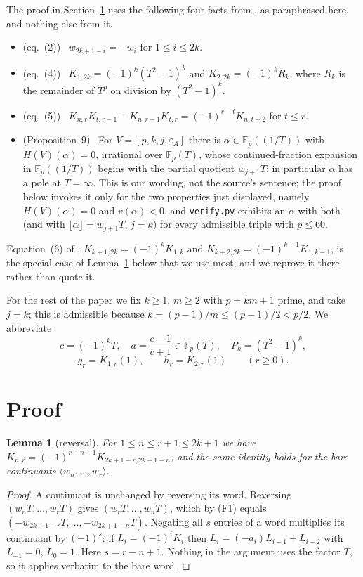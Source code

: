\documentclass[11pt]{amsart}
\newtheorem{lemma}[theorem]{Lemma}
\theoremstyle{remark}
\newcommand{\Fp}{\mathbb F_p}
\newcommand{\Kc}[2]{K_{#1,#2}}
\newcommand{\HV}{H(V)}
\begin{document}
The proof in Section~\ref{sec:proof} uses the following four facts from \cite{L}, as paraphrased
here, and nothing else from it.
\begin{itemize}
\item[(F1)] (eq.~(2)) \ $w_{2k+1-i}=-w_i$ for $1\le i\le 2k$.
\item[(F2)] (eq.~(4)) \ $\Kc1{2k}=(-1)^k(T^2-1)^k$ and $\Kc2{2k}=(-1)^kR_k$, where $R_k$ is the
      remainder of $T^p$ on division by $(T^2-1)^k$.
\item[(F3)] (eq.~(5)) \ $\Kc nr\Kc t{r-1}-\Kc n{r-1}\Kc tr=(-1)^{r-t}\Kc n{t-2}$ for $t\le r$.
\item[(F4)] (Proposition~9) \ For $V=[p,k,j,\varepsilon_A]$ there is $\alpha\in\Fp((1/T))$ with
      $\HV(\alpha)=0$, irrational over $\Fp(T)$, whose continued-fraction expansion in
      $\Fp((1/T))$ begins with the partial quotient $w_{j+1}T$; in particular $\alpha$ has a pole
      at $T=\infty$. This is our wording, not the source's sentence; the proof below invokes it only
      for the two properties just displayed, namely $\HV(\alpha)=0$ and $v(\alpha)<0$, and
      \texttt{verify.py} exhibits an $\alpha$ with both (and with
      $\lfloor\alpha\rfloor=w_{j+1}T$, $j=k$) for every admissible triple with $p\le60$.
\end{itemize}
Equation~(6) of \cite{L}, $\Kc{k+1}{2k}=(-1)^k\Kc1k$ and $\Kc{k+2}{2k}=(-1)^{k-1}\Kc1{k-1}$, is the
special case of Lemma~\ref{lem:rev} below that we use most, and we reprove it there rather than
quote it.

For the rest of the paper we fix $k\ge1$, $m\ge2$ with $p=km+1$ prime, and take $j=k$; this is
admissible because $k=(p-1)/m\le(p-1)/2<p/2$. We abbreviate
\[
 c=(-1)^kT,\quad a=\frac{c-1}{c+1}\in\Fp(T),\quad P_k=(T^2-1)^k,
\]
\[
 g_r=\Kc1r(1),\qquad h_r=\Kc2r(1)\qquad(r\ge0).
\]

\section{Proof}\label{sec:proof}

\begin{lemma}[reversal]\label{lem:rev}
For $1\le n\le r+1\le 2k+1$ we have
$\Kc nr=(-1)^{r-n+1}\Kc{2k+1-r}{2k+1-n}$, and the same identity holds for the bare continuants
$\langle w_n,\dots,w_r\rangle$.
\end{lemma}

\begin{proof}
A continuant is unchanged by reversing its word. Reversing $(w_nT,\dots,w_rT)$ gives
$(w_rT,\dots,w_nT)$, which by (F1) equals $(-w_{2k+1-r}T,\dots,-w_{2k+1-n}T)$. Negating all $s$
entries of a word multiplies its continuant by $(-1)^{s}$: if $L_i=(-1)^iK_i$ then
$L_i=(-a_i)L_{i-1}+L_{i-2}$ with $L_{-1}=0$, $L_0=1$. Here $s=r-n+1$. Nothing in the argument uses
the factor $T$, so it applies verbatim to the bare word.
\end{proof}
\end{document}
